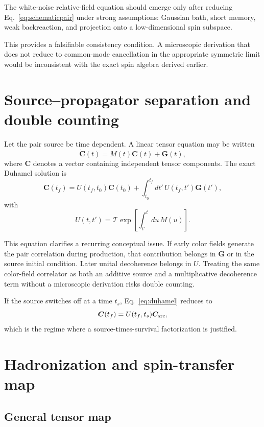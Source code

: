 \documentclass[11pt]{article}
\begin{document}
The white-noise relative-field equation should emerge only after reducing Eq.~\eqref{eq:schematicpair} under strong assumptions: Gaussian bath, short memory, weak backreaction, and projection onto a low-dimensional spin subspace.

This provides a falsifiable consistency condition. A microscopic derivation that does not reduce to common-mode cancellation in the appropriate symmetric limit would be inconsistent with the exact spin algebra derived earlier.

\section{Source--propagator separation and double counting}

Let the pair source be time dependent. A linear tensor equation may be written
\begin{equation}
\dot{\bm C}(t)=M(t)\bm C(t)+\bm G(t),
\end{equation}
where $\bm C$ denotes a vector containing independent tensor components. The exact Duhamel solution is
\begin{equation}
\boxed{
\bm C(t_f)
=U(t_f,t_0)\bm C(t_0)
+\int_{t_0}^{t_f}dt'\,U(t_f,t')\bm G(t'),
}
\label{eq:duhamel}
\end{equation}
with
\begin{equation}
U(t,t')=\mathcal T\exp\left[\int_{t'}^t du\,M(u)\right].
\end{equation}

This equation clarifies a recurring conceptual issue. If early color fields generate the pair correlation during production, that contribution belongs in $\bm G$ or in the source initial condition. Later unital decoherence belongs in $U$. Treating the same color-field correlator as both an additive source and a multiplicative decoherence term without a microscopic derivation risks double counting.

If the source switches off at a time $t_s$, Eq.~\eqref{eq:duhamel} reduces to
\begin{equation}
\bm C(t_f)=U(t_f,t_s)\bm C_{\rm src},
\end{equation}
which is the regime where a source-times-survival factorization is justified.

\section{Hadronization and spin-transfer map}

\subsection{General tensor map}
\end{document}
